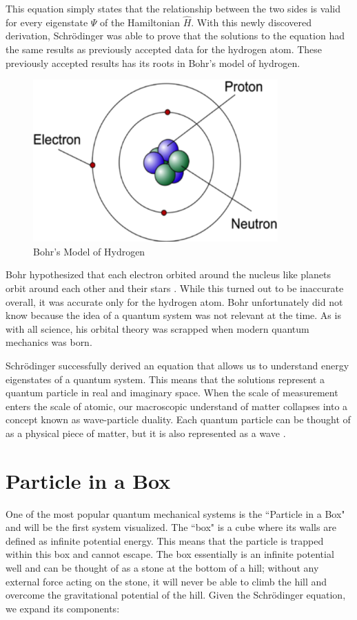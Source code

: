 \documentclass[11pt]{article}
\begin{document}
\noindent This equation simply states that the relationship between the two sides is valid for every eigenstate $\Psi$ of the Hamiltonian $\hat{H}$. With this newly discovered derivation, Schrödinger was able to prove that the solutions to the equation had the same results as previously accepted data for the hydrogen atom. These previously accepted results has its roots in Bohr's model of hydrogen. 

\begin{figure}[h]
	\centering
	\includegraphics[width = .4\textwidth]{bohrs}
	\caption{Bohr's Model of Hydrogen} 
\end{figure}

\noindent Bohr hypothesized that each electron orbited around the nucleus like planets orbit around each other and their stars \cite{modernphysics}. While this turned out to be inaccurate overall, it was accurate only for the hydrogen atom. Bohr unfortunately did not know because the idea of a quantum system was not relevant at the time. As is with all science, his orbital theory was scrapped when modern quantum mechanics was born.

Schrödinger successfully derived an equation that allows us to understand energy eigenstates of a quantum system. This means that the solutions represent a quantum particle in real and imaginary space. When the scale of measurement enters the scale of atomic, our macroscopic understand of matter collapses into a concept known as wave-particle duality. Each quantum particle can be thought of as a physical piece of matter, but it is also represented as a wave \cite{modernphysics}. 

\section{Particle in a Box}
One of the most popular quantum mechanical systems is the ``Particle in a Box" and will be the first system visualized. The ``box" is a cube where its walls are defined as infinite potential energy. This means that the particle is trapped within this box and cannot escape. The box essentially is an infinite potential well and can be thought of as a stone at the bottom of a hill; without any external force acting on the stone, it will never be able to climb the hill and overcome the gravitational potential of the hill. Given the Schrödinger equation, we expand its components:
\end{document}
